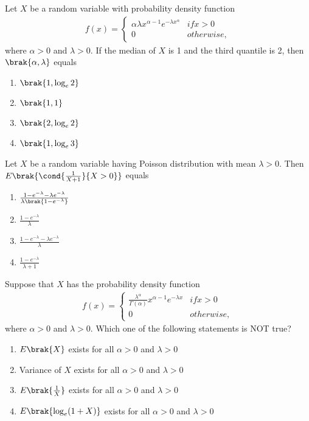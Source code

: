 \item Let $ X $ be a random variable with probability density function
\begin{align*}
    f(x) = \begin{cases} 
      \alpha \lambda x^{\alpha -1} e^{-\lambda x^{\alpha}} & if x > 0 \\ 
      0 & otherwise, 
   \end{cases}
\end{align*}
where $ \alpha > 0 $ and $ \lambda > 0 $. If the median of $ X $ is 1 and the third quantile is 2, then $ \brak{\alpha, \lambda} $ equals
\begin{enumerate}
    \item $\brak{1,  \log_e 2 }$
    \item $\brak{1, 1}$
    \item $\brak{2,  \log_e 2 }$
    \item $\brak{1,  \log_e 3 }$
\end{enumerate}

\item Let $ X $ be a random variable having Poisson distribution with mean $ \lambda > 0 $. Then
$E \brak{\cond {\frac{1}{X+1}} {X > 0}}$ equals
\begin{enumerate}
    \item $ \frac{1 - e^{-\lambda} - \lambda e^{-\lambda}}{\lambda \brak{1- e^{-\lambda}}} $
    \item $ \frac{1-e^{-\lambda}}{\lambda} $
    \item $ \frac{1 - e^{-\lambda} - \lambda e^{-\lambda}}{\lambda } $
    \item $ \frac{1-e^{-\lambda}}{\lambda+1} $
\end{enumerate}

\item Suppose that $ X $ has the probability density function
\begin{align*}
    f(x) = \begin{cases} 
      \frac{\lambda^{\alpha}}{\Gamma(\alpha)} x^{\alpha - 1} e^{-\lambda x} & if  x > 0 \\ 
      0 & otherwise, 
   \end{cases}
\end{align*}
where $ \alpha > 0 $ and $ \lambda > 0 $. Which one of the following statements is NOT true?
\begin{enumerate}
    \item $ E\brak{X}$ exists for all $ \alpha > 0 $ and $ \lambda > 0 $
    \item Variance of $ X $ exists for all $ \alpha > 0 $ and $ \lambda > 0 $
    \item $ E\brak{\frac{1}{X} } $ exists for all $ \alpha > 0 $ and $ \lambda > 0 $
    \item $ E\brak{\log_e (1 + X)}$ exists for all $ \alpha > 0 $ and $ \lambda > 0 $
\end{enumerate}


